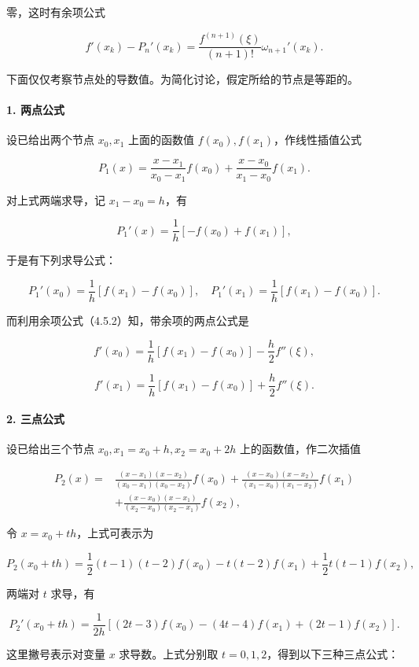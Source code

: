 \documentclass[
  10pt,
  fontset=fandol]{ctexart}
\begin{document}
零，这时有余项公式

\[
f'(x_k)-P_n'(x_k)=\frac{f^{(n+1)}(\xi)}{(n+1)!}\omega_{n+1}'(x_k).
\tag{4.5.2}
\]

下面仅仅考察节点处的导数值。为简化讨论，假定所给的节点是等距的。

\paragraph{1. 两点公式}\label{ux4e24ux70b9ux516cux5f0f}

设已给出两个节点 \(x_0,x_1\) 上面的函数值 \(f(x_0),f(x_1)\)，作线性插值公式

\[
P_1(x)=\frac{x-x_1}{x_0-x_1}f(x_0)+\frac{x-x_0}{x_1-x_0}f(x_1).
\]

对上式两端求导，记 \(x_1-x_0=h\)，有

\[
P_1'(x)=\frac1h[-f(x_0)+f(x_1)],
\]

于是有下列求导公式：

\[
P_1'(x_0)=\frac1h[f(x_1)-f(x_0)],\quad
P_1'(x_1)=\frac1h[f(x_1)-f(x_0)].
\]

而利用余项公式（4.5.2）知，带余项的两点公式是

\[
f'(x_0)=\frac1h[f(x_1)-f(x_0)]-\frac h2f''(\xi),
\]

\[
f'(x_1)=\frac1h[f(x_1)-f(x_0)]+\frac h2f''(\xi).
\]

\paragraph{2. 三点公式}\label{ux4e09ux70b9ux516cux5f0f}

设已给出三个节点 \(x_0,x_1=x_0+h,x_2=x_0+2h\) 上的函数值，作二次插值

\[
\begin{aligned}
P_2(x)={}&\frac{(x-x_1)(x-x_2)}{(x_0-x_1)(x_0-x_2)}f(x_0)
+\frac{(x-x_0)(x-x_2)}{(x_1-x_0)(x_1-x_2)}f(x_1)\\
&+\frac{(x-x_0)(x-x_1)}{(x_2-x_0)(x_2-x_1)}f(x_2),
\end{aligned}
\]

令 \(x=x_0+th\)，上式可表示为

\[
P_2(x_0+th)=\frac12(t-1)(t-2)f(x_0)-t(t-2)f(x_1)
+\frac12t(t-1)f(x_2),
\]

两端对 \(t\) 求导，有

\[
P_2'(x_0+th)=\frac1{2h}[(2t-3)f(x_0)-(4t-4)f(x_1)+(2t-1)f(x_2)].
\tag{4.5.3}
\]

这里撇号表示对变量 \(x\) 求导数。上式分别取 \(t=0,1,2\)，得到以下三种三点公式：
\end{document}
